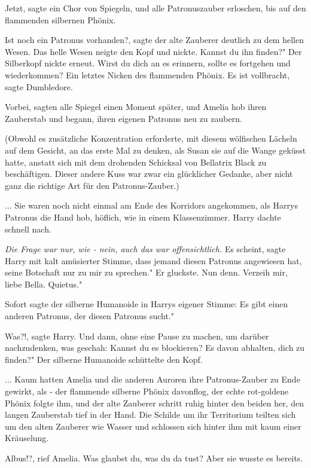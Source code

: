 \glqq Jetzt\grqq{}, sagte ein Chor von Spiegeln, und alle Patronuszauber
erloschen, bis auf den flammenden silbernen Phönix.

\glqq Ist noch ein Patronus vorhanden?\grqq{}, sagte der alte Zauberer deutlich
zu dem hellen Wesen. Das helle Wesen neigte den Kopf und nickte. \glqq Kannst du
ihn finden?" Der Silberkopf nickte erneut. \glqq Wirst du dich an es erinnern,
sollte es fortgehen und wiederkommen?\grqq{} Ein letztes Nicken des flammenden
Phönix. \glqq Es ist vollbracht\grqq{}, sagte Dumbledore.

\glqq Vorbei\grqq{}, sagten alle Spiegel einen Moment später, und Amelia hob
ihren Zauberstab und begann, ihren eigenen Patronus neu zu zaubern.

(Obwohl es zusätzliche Konzentration erforderte, mit diesem wölfischen Lächeln
auf dem Gesicht, an das erste Mal zu denken, als Susan sie auf die Wange geküsst
hatte, anstatt sich mit dem drohenden Schicksal von Bellatrix Black zu
beschäftigen. Dieser andere Kuss war zwar ein glücklicher Gedanke, aber nicht
ganz die richtige Art für den Patronus-Zauber.)


... Sie waren noch nicht einmal am Ende des Korridors angekommen, als Harrys
Patronus die Hand hob, höflich, wie in einem Klassenzimmer. Harry dachte schnell
nach.\emph{ }

\emph{Die Frage war nur, wie - nein, auch das war offensichtlich.}
\glqq Es scheint\grqq{}, sagte Harry mit kalt amüsierter Stimme, \glqq dass
jemand diesen Patronus angewiesen hat, seine Botschaft nur zu mir zu sprechen."
Er gluckste. \glqq Nun denn. Verzeih mir, liebe Bella. Quietus."

Sofort sagte der silberne Humanoide in Harrys eigener Stimme: \glqq Es gibt
einen anderen Patronus, der diesen Patronus sucht."

\glqq Was?!\grqq{}, sagte Harry. Und dann, ohne eine Pause zu machen, um darüber
nachzudenken, was geschah: \glqq Kannst du es blockieren? Es davon abhalten,
dich zu finden?" Der silberne Humanoide schüttelte den Kopf.


... Kaum hatten Amelia und die anderen Auroren ihre Patronus-Zauber zu Ende
gewirkt, als - der flammende silberne Phönix davonflog, der echte rot-goldene
Phönix folgte ihm, und der alte Zauberer schritt ruhig hinter den beiden her,
den langen Zauberstab tief in der Hand. Die Schilde um ihr Territorium teilten
sich um den alten Zauberer wie Wasser und schlossen sich hinter ihm mit kaum
einer Kräuselung.

\glqq Albus!?\grqq{}, rief Amelia. \glqq Was glaubst du, was du da tust?\grqq{}
Aber sie wusste es bereits.

